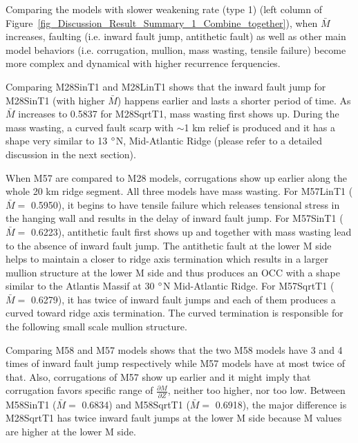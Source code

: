 Comparing the models with slower weakening rate (type 1) (left column of Figure~\hyperref[fig_Discussion_Result_Summary_1_Combine_together]{\ref{fig_Discussion_Result_Summary_1_Combine_together}}), when $\bar{M}$ increases, faulting (i.e. inward fault jump, antithetic fault) as well as other main model behaviors (i.e. corrugation, mullion, mass wasting, tensile failure) become more complex and dynamical with higher recurrence ferquencies.

Comparing M28SinT1 and M28LinT1 shows that the inward fault jump for M28SinT1 (with higher $\bar{M}$) happens earlier and lasts a shorter period of time. As $\bar{M}$ increases to 0.5837 for M28SqrtT1, mass wasting first shows up. During the mass wasting, a curved fault scarp with $\sim$1 km relief is produced and it has a shape very similar to 13 $\degree$N, Mid-Atlantic Ridge (please refer to a detailed discussion in the next section). 

When M57 are compared to M28 models, corrugations show up earlier along the whole 20 km ridge segment. All three models have mass wasting. For M57LinT1 ($\bar{M} =$ 0.5950), it begins to have tensile failure which releases tensional stress in the hanging wall and results in the delay of inward fault jump. For M57SinT1 ($\bar{M} =$ 0.6223), antithetic fault first shows up and together with mass wasting lead to the absence of inward fault jump. The antithetic fault at the lower M side helps to maintain a closer to ridge axis termination which results in a larger mullion structure at the lower M side and thus produces an OCC with a shape similar to the Atlantis Massif at 30 $\degree$N Mid-Atlantic Ridge. For M57SqrtT1 ($\bar{M} =$ 0.6279), it has twice of inward fault jumps and each of them produces a curved toward ridge axis termination. The curved termination is responsible for the following small scale mullion structure.
   
Comparing M58 and M57 models shows that the two M58 models have 3 and 4 times of inward fault jump respectively while M57 models have at most twice of that. Also, corrugations of M57 show up earlier and it might imply that corrugation favors specific range of $\frac{\partial M}{\partial Z}$, neither too higher, nor too low. Between M58SinT1 ($\bar{M} =$ 0.6834) and M58SqrtT1 ($\bar{M} =$ 0.6918), the major difference is M28SqrtT1 has twice inward fault jumps at the lower M side because M values are higher at the lower M side.

